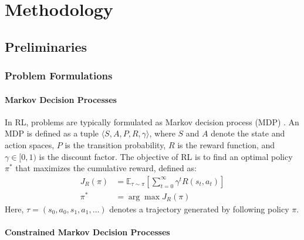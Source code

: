 \section{Methodology}


\subsection{Preliminaries}

\subsubsection{Problem Formulations}

\paragraph{Markov Decision Processes}

In RL, problems are typically formulated as Markov decision process (MDP) \cite{sutton1998reinforcement}.
An MDP is defined as a tuple $\langle S, A, P, R, \gamma \rangle$, where $S$ and $A$ denote the state and action spaces, $P$ is the transition probability, $R$ is the reward function, and $\gamma \in [0, 1)$ is the discount factor.
The objective of RL is to find an optimal policy $\pi^*$ that maximizes the cumulative reward, defined as:
\begin{equation} \label{eq:mdp_optimization_problem}
    \begin{aligned}
        J_R(\pi) &= \mathbb{E}_{\tau \sim \pi}\!\left[\sum^\infty_{t = 0} \gamma^t R(s_t, a_t)\right] \\
        \pi^* &= \arg \max J_R(\pi)
    \end{aligned}
\end{equation}
Here, $\tau = (s_0, a_0, s_1, a_1, \ldots)$ denotes a trajectory generated by following policy $\pi$.

\paragraph{Constrained Markov Decision Processes}

